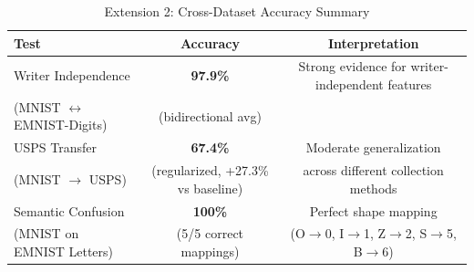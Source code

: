 
\begin{table}[h]
\centering
\caption{Extension 2: Cross-Dataset Accuracy Summary}
\label{tab:extension2_summary}
\begin{tabular}{lcc}
\toprule
\textbf{Test} & \textbf{Accuracy} & \textbf{Interpretation} \\
\midrule
Writer Independence & \textbf{97.9\%} & Strong evidence for writer-independent features \\
(MNIST $\leftrightarrow$ EMNIST-Digits) & (bidirectional avg) & \\
\midrule
USPS Transfer & \textbf{67.4\%} & Moderate generalization \\
(MNIST $\rightarrow$ USPS) & (regularized, +27.3\% vs baseline) & across different collection methods \\
\midrule
Semantic Confusion & \textbf{100\%} & Perfect shape mapping \\
(MNIST on EMNIST Letters) & (5/5 correct mappings) & (O$\rightarrow$0, I$\rightarrow$1, Z$\rightarrow$2, S$\rightarrow$5, B$\rightarrow$6) \\
\bottomrule
\end{tabular}
\end{table}
